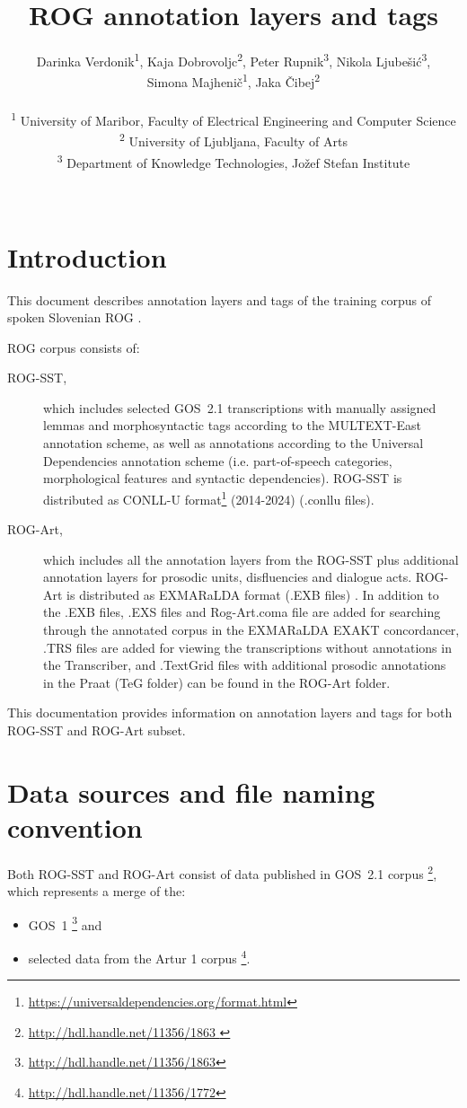 \documentclass[a4paper,oneside,12pt]{article}
\title{ROG annotation layers and tags}
\author{{}\vspace*{\fill} Darinka Verdonik\textsuperscript{1}, Kaja
Dobrovoljc\textsuperscript{2}, Peter Rupnik\textsuperscript{3}, Nikola
Ljubešić\textsuperscript{3}, \\ Simona Majhenič\textsuperscript{1}, Jaka
Čibej\textsuperscript{2} \\ \vspace{5cm} \\
\textsuperscript{1} University of Maribor, Faculty of Electrical Engineering and
Computer Science \\
\textsuperscript{2} University of Ljubljana, Faculty of Arts \\
\textsuperscript{3} Department of Knowledge Technologies, Jožef Stefan Institute
\\ \vspace{\fill} \\
}
\begin{document}
\maketitle
\pagebreak
{}

\section{Introduction}

This document describes annotation layers and tags of the training corpus of
spoken Slovenian ROG \cite{verdonik2024c}.


ROG corpus consists of:
\begin{description}
  \item[ROG-SST,]  which includes selected GOS~2.1 transcriptions with manually
    assigned lemmas and morphosyntactic tags according to the MULTEXT-East
    annotation scheme, as well as annotations according to the Universal
    Dependencies annotation scheme (i.e. part-of-speech categories,
    morphological features and syntactic dependencies). ROG-SST is distributed
    as CONLL-U format\footnote{
      \url{https://universaldependencies.org/format.html}
    } (2014-2024) (.conllu files).
  \item[ROG-Art,] which includes all the annotation layers from the ROG-SST plus
    additional annotation layers for prosodic units, disfluencies and dialogue
    acts. ROG-Art is distributed as EXMARaLDA format (.EXB files)
    \cite{schmidtworner2014}. In addition to the .EXB files, .EXS files and
    Rog-Art.coma file are added for searching through the annotated corpus in
    the EXMARaLDA EXAKT concordancer, .TRS files \cite{barras2001transcriber}
    are added for viewing the transcriptions without annotations in the
    Transcriber, and .TextGrid files \cite{boersma19922022} with additional
    prosodic annotations in the Praat (TeG folder) can be found in the ROG-Art
    folder.
\end{description}

This documentation provides information on annotation layers and tags for both
ROG-SST and ROG-Art subset.

\section{Data sources and file naming convention}

Both ROG-SST and ROG-Art consist of data published in GOS~2.1 corpus
\cite{verdonik2024a}\footnote{\url{ http://hdl.handle.net/11356/1863 }}, which
represents a merge of the:
\begin{itemize}
  \item GOS~1  \cite{verdonik2013}\footnote{
          \url{http://hdl.handle.net/11356/1863}} and
  \item selected data from the Artur 1 corpus \cite{verdonik2024b}\footnote{
          \url{http://hdl.handle.net/11356/1772}
        }.
\end{itemize}
\end{document}
